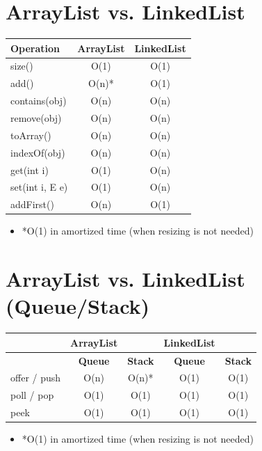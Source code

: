 \documentclass{article}
\begin{document}
\section{ArrayList vs. LinkedList}
\begin{table}[!ht]
\centering
\begin{tabular}{|l|c|c|}
\hline
\textbf{Operation} & \textbf{ArrayList} & \textbf{LinkedList} \\
\hline
size() & O(1) & O(1) \\
\hline
add() & O(n)* & O(1) \\
\hline
contains(obj) & O(n) & O(n) \\
\hline
remove(obj) & O(n) & O(n) \\
\hline
toArray() & O(n) & O(n) \\
\hline
indexOf(obj) & O(n) & O(n) \\
\hline
get(int i) & O(1) & O(n) \\
\hline
set(int i, E e) & O(1) & O(n) \\
\hline
addFirst() & O(n) & O(1) \\
\hline
\end{tabular}
\end{table}
\begin{itemize}
  \item *O(1) in amortized time (when resizing is not needed)
\end{itemize}


\section{ArrayList vs. LinkedList (Queue/Stack)}
\begin{table}[!ht]
\centering
\begin{tabular}{|l|c|c|c|c|}
\hline
& \textbf{ArrayList} & & \textbf{LinkedList} & \\
\hline
& \textbf{Queue} & \textbf{Stack} & \textbf{Queue} & \textbf{Stack} \\
\hline
offer / push & O(n) & O(n)* & O(1) & O(1) \\
\hline
poll / pop & O(1) & O(1) & O(1) & O(1) \\
\hline
peek & O(1) & O(1) & O(1) & O(1) \\
\hline
\end{tabular}
\end{table}
\begin{itemize}
  \item *O(1) in amortized time (when resizing is not needed)
\end{itemize}
\end{document}
